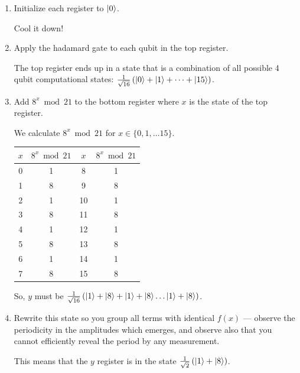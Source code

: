 \documentclass[12pt]{article}
\newcommand{\rsqrt}[1]{\ensuremath{\frac{1}{\sqrt{#1}}}}
\newenvironment{answer}{\begingroup\setlength{\leftskip}{-\leftmargin}\begin{framed}}{\end{framed}\endgroup}
\begin{document}
\begin{enumerate}
    \item Initialize each register to $\ket{0}$.

    \begin{answer}
    	Cool it down!
    \end{answer}

    \item Apply the hadamard gate to each qubit in the top register.

    \begin{answer}
    	The top register ends up in a state that is a combination of all possible 4 qubit computational states: $\rsqrt{16}\left(\ket{0} + \ket{1} + \dots + \ket{15}\right)$.
    \end{answer}

    \item Add $8^x\bmod21$ to the bottom register where $x$ is the state of the top register.

    \begin{answer}
    	We calculate $8^x\bmod21$ for $x \in \{0, 1, \dots 15\}$.

    	\begin{tabular}{c|c||c|c}
    		$x$ & $8^x\bmod21$ & $x$ & $8^x\bmod21$ \\
    		\hline
    		0 & 1 & 8 & 1 \\
    		1 & 8 & 9 & 8 \\
    		2 & 1 & 10 & 1 \\
    		3 & 8 & 11 & 8 \\
    		4 & 1 & 12 & 1 \\
    		5 & 8 & 13 & 8 \\
    		6 & 1 & 14 & 1 \\
    		7 & 8 & 15 & 8 \\
    	\end{tabular}

    	So, $y$ must be $\rsqrt{16}\left(\ket{1} + \ket{8} + \ket{1} + \ket{8} \dots \ket{1} + \ket{8}\right)$.
    \end{answer}

    \item Rewrite this state so you group all terms with identical $f(x)$ — observe the periodicity in the amplitudes which emerges, and observe also that you cannot efficiently reveal the period by any measurement.

    \begin{answer}
       	This means that the $y$ register is in the state $\rsqrt{2}\left(\ket{1} + \ket{8}\right)$.


\end{answer}
\end{enumerate}
\end{document}
